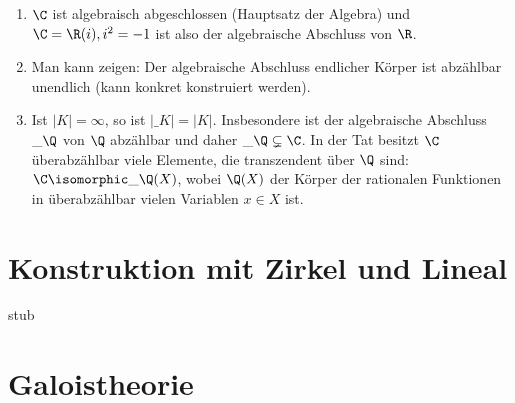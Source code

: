 \begin{nt} \label{18.4-10}
	\begin{enumerate}[1.)]
		\item
			$\C$ ist algebraisch abgeschlossen (Hauptsatz der Algebra) und $\C = \R(i), i^2 = -1$ ist also der algebraische Abschluss von $\R$.
		\item
			Man kann zeigen:
			Der algebraische Abschluss endlicher Körper ist abzählbar unendlich (kann konkret konstruiert werden).
		\item
			Ist $|K| = \infty$, so ist $|\_K| = |K|$.
			Insbesondere ist der algebraische Abschluss $\_\Q$ von $\Q$ abzählbar und daher $\_\Q \subsetneq \C$.
			In der Tat besitzt $\C$ überabzählbar viele Elemente, die transzendent über $\Q$ sind: $\C \isomorphic \_{\Q(X)}$, wobei $\Q(X)$ der Körper der rationalen Funktionen in überabzählbar vielen Variablen $x \in X$ ist.
	\end{enumerate}
\end{nt}


\section{Konstruktion mit Zirkel und Lineal}


stub


\section{Galoistheorie}



